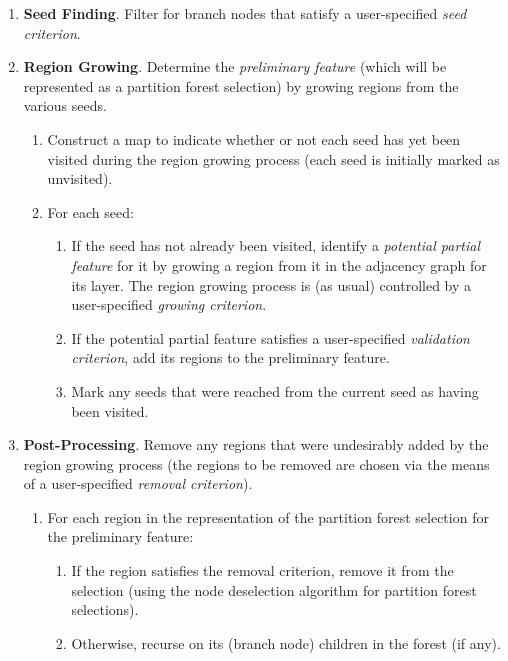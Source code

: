 \begin{enumerate}

\item \textbf{Seed Finding}. Filter for branch nodes that satisfy a user-specified \emph{seed criterion}.
\item \textbf{Region Growing}. Determine the \emph{preliminary feature} (which will be represented as a partition forest selection) by growing regions from the various seeds.

\begin{enumerate}

\item Construct a map to indicate whether or not each seed has yet been visited during the region growing process (each seed is initially marked as unvisited).
\item For each seed:

\begin{enumerate}

\item If the seed has not already been visited, identify a \emph{potential partial feature} for it by growing a region from it in the adjacency graph for its layer. The region growing process is (as usual) controlled by a user-specified \emph{growing criterion}.
\item If the potential partial feature satisfies a user-specified \emph{validation criterion}, add its regions to the preliminary feature.
\item Mark any seeds that were reached from the current seed as having been visited.

\end{enumerate}

\end{enumerate}

\item \textbf{Post-Processing}. Remove any regions that were undesirably added by the region growing process (the regions to be removed are chosen via the means of a user-specified \emph{removal criterion}).

\begin{enumerate}

\item For each region in the representation of the partition forest selection for the preliminary feature:

\begin{enumerate}

\item If the region satisfies the removal criterion, remove it from the selection (using the node deselection algorithm for partition forest selections).
\item Otherwise, recurse on its (branch node) children in the forest (if any).

\end{enumerate}

\end{enumerate}

\end{enumerate}

